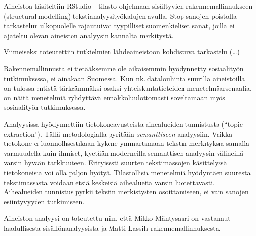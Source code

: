 Aineistoa käsiteltiin RStudio - tilasto-ohjelmaan sisältyvien
rakennemallinnukseen (structural modelling) tekstianalyysityökalujen
avulla. Stop-sanojen poistolla tarkastelun ulkopuolelle rajautuivat
tyypilliset suomenkieliset sanat, joilla ei ajateltu olevan aineiston
analyysin kannalta merkitystä.

Viimeiseksi toteutettiin tutkielmien lähdeaineistoon kohdistuva
tarkastelu (\ldots{})

Rakennemallinnusta ei tietääksemme ole aikaisemmin hyödynnetty
sosiaalityön tutkimuksessa, ei ainakaan Suomessa. Kun nk. datalouhinta
suurilla aineistoilla on tulossa entistä tärkeämmäksi osaksi
yhteiskuntatieteiden menetelmäarsenaalia, on näitä menetelmiä ryhdyttävä
ennakkoluulottomasti soveltamaan myös sosiaalityön tutkimuksessa.

Analyysissa hyödynnettiin tietokoneavusteista ainealueiden tunnistusta
(``topic extraction''). Tällä metodologialla pyritään
\emph{semanttiseen} analyysiin. Vaikka tietokone ei luonnollisestikaan
kykene ymmärtämään tekstin merkityksiä samalla varmuudella kuin
ihmiset, kyetään moderneilla semanttisen analyysin välineillä varsin
hyvään tarkkuuteen. Erityisesti suurten tekstimassojen käsittelyssä
tietokoneista voi olla paljon hyötyä. Tilastollisia menetelmiä
hyödyntäen suuresta tekstimassasta voidaan etsiä keskeisiä aihealueita
varsin luotettavasti. Aihealueiden tunnistus pyrkii tekstin
merkistysten osoittamiseen, ei vain sanojen esiintyvyyden
tutkimiseen. \citep[57-59.]{leetaru}

Aineiston analyysi on toteutettu niin, että Mikko Mäntysaari on
vastannut laadullisesta sisällönanalyysista ja Matti Lassila
rakennemallinnuksesta.

